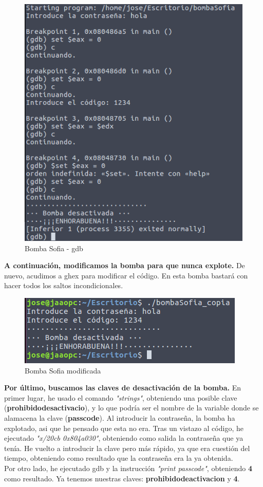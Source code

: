 \documentclass[11pt,a4paper]{article}
\begin{document}
\begin{figure}[H] 
	\centering
	\includegraphics[scale=0.45]{capturas/bombasofia1.png} 
	\caption{Bomba Sofia - gdb} \label{fig:figura25}
\end{figure}

\textbf{A continuación, modificamos la bomba para que nunca explote.} De nuevo, acudimos a ghex para modificar el código. En esta bomba bastará con hacer todos los saltos incondicionales. \\

\begin{figure}[H] 
	\centering
	\includegraphics[scale=0.45]{capturas/bombasofia2.png} 
	\caption{Bomba Sofia modificada} \label{fig:figura25}
\end{figure}

\textbf{Por último, buscamos las claves de desactivación de la bomba.} En primer lugar, he usado el comando \emph{"strings"}, obteniendo una posible clave (\textbf{prohibidodesactivacio}), y lo que podría ser el nombre de la variable donde se alamacena la clave (\textbf{passcode}). Al introducir la contraseña, la bomba ha explotado, asi que he pensado que esta no era. 
Tras un vistazo al código, he ejecutado \emph{"x/20cb 0x804a030"}, obteniendo como salida la contraseña que ya tenía. He vuelto a introducir la clave pero más rápido, ya que era cuestión del tiempo, obteniendo como resultado que la contraseña era la ya obtenida. \\
Por otro lado, he ejecutado gdb y la instrucción \emph{"print passcode"}, obteniendo \textbf{4} como resultado. Ya tenemos nuestras claves: \textbf{prohibidodeactivacion} y \textbf{4}. \\
\end{document}
